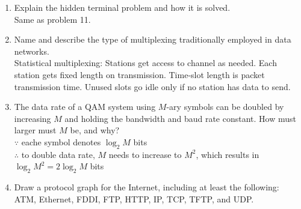 \documentclass[10pt, a4paper]{article}
\begin{document}
\begin{enumerate}
    \color{black}
\item\mbox{}Explain the hidden terminal problem and how it is solved.\\
    \color{blue}
    Same as problem 11.
    \color{black}
\item\mbox{}Name and describe the type of multiplexing traditionally employed in data networks.\\
    \color{blue}
    Statistical multiplexing: Stations get access to channel as needed. Each station gets fixed length on transmission. Time-slot length is packet transmission time. Unused slots go idle only if no station has data to send.
    \color{black}
\item\mbox{}The data rate of a QAM system using $M$-ary symbols can be doubled by increasing $M$ and holding the bandwidth and baud rate constant. How must larger must $M$ be, and why?\\
    \color{blue}
    $\because$ eache symbol denotes $\log_2M$ bits\\
    $\therefore$ to double data rate, $M$ needs to increase to $M^2$, which results in $\log_2M^2 = 2\log_2M$ bits
    \color{black}
\item\mbox{}Draw a protocol graph for the Internet, including at least the following: ATM, Ethernet, FDDI, FTP, HTTP, IP, TCP, TFTP, and UDP.\\
    \color{blue}
\end{enumerate}
\end{document}
